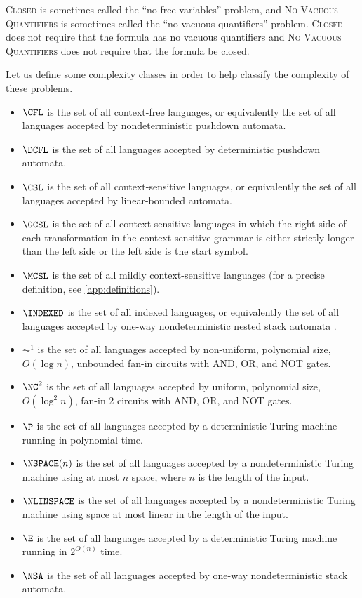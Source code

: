 \documentclass{article}
\newcommand{\CLOSED}{\textsc{Closed}}
\newcommand{\NVQ}{\textsc{No Vacuous Quantifiers}}
\begin{document}
\CLOSED{} is sometimes called the ``no free variables'' problem, and \NVQ{} is sometimes called the ``no vacuous quantifiers'' problem.
\CLOSED{} does not require that the formula has no vacuous quantifiers and \NVQ{} does not require that the formula be closed.

Let us define some complexity classes in order to help classify the complexity of these problems.
\begin{definition}\mbox{}
  \begin{itemize}
  \item $\CFL$ is the set of all context-free languages, or equivalently the set of all languages accepted by nondeterministic pushdown automata.
  \item $\DCFL$ is the set of all languages accepted by deterministic pushdown automata.
  \item $\CSL$ is the set of all context-sensitive languages, or equivalently the set of all languages accepted by linear-bounded automata.
  \item $\GCSL$ is the set of all context-sensitive languages in which the right side of each transformation in the context-sensitive grammar is either strictly longer than the left side or the left side is the start symbol.
  \item $\MCSL$ is the set of all mildly context-sensitive languages (for a precise definition, see \autoref{app:definitions}).
  \item $\INDEXED$ is the set of all indexed languages, or equivalently the set of all languages accepted by one-way nondeterministic nested stack automata \autocite{aho}.
  \item $\AC^1$ is the set of all languages accepted by non-uniform, polynomial size, $O(\log n)$, unbounded fan-in circuits with AND, OR, and NOT gates.
  \item $\NC^2$ is the set of all languages accepted by uniform, polynomial size, $O(\log^2 n)$, fan-in 2 circuits with AND, OR, and NOT gates.
  \item $\P$ is the set of all languages accepted by a deterministic Turing machine running in polynomial time.
  \item $\NSPACE(n)$ is the set of all languages accepted by a nondeterministic Turing machine using at most $n$ space, where $n$ is the length of the input.
  \item $\NLINSPACE$ is the set of all languages accepted by a nondeterministic Turing machine using space at most linear in the length of the input.
  \item $\E$ is the set of all languages accepted by a deterministic Turing machine running in $2^{O(n)}$ time.
  \item $\NSA$ is the set of all languages accepted by one-way nondeterministic stack automata.
  \end{itemize}
\end{definition}
\end{document}
